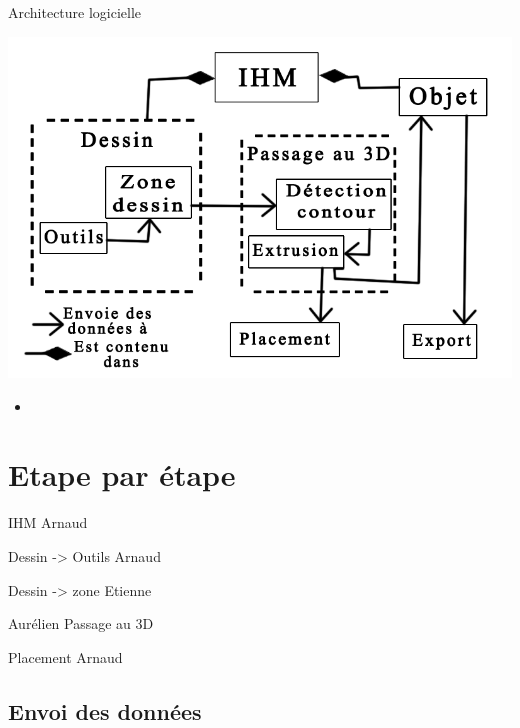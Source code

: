 \documentclass[a4paper,10pt]{beamer}
\begin{document}
	\begin{frame}{Architecture logicielle} %
		\centerline{\includegraphics[scale=0.3]{images/archilogi/archi.png}}
		\begin{itemize}
			\item 
		\end{itemize}
	\end{frame}	
	
			
	\section{Etape par étape}
	\begin{frame}
		IHM Arnaud
	\end{frame}
	
	\begin{frame}
		Dessin -> Outils Arnaud
	\end{frame}
	
	\begin{frame}
		Dessin -> zone Etienne
	\end{frame}
	
	\begin{frame}
		Aurélien Passage au 3D
	\end{frame}
	
	\begin{frame}
		Placement Arnaud
	\end{frame}
	
	\subsection{Envoi des données}
	
\end{document}
